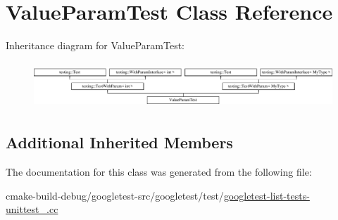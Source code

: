 \hypertarget{classValueParamTest}{}\section{Value\+Param\+Test Class Reference}
\label{classValueParamTest}
Inheritance diagram for Value\+Param\+Test\+:\begin{figure}[H]
\begin{center}
\leavevmode
\includegraphics[height=1.735537cm]{classValueParamTest}
\end{center}
\end{figure}
\subsection*{Additional Inherited Members}


The documentation for this class was generated from the following file\+:\begin{DoxyCompactItemize}
\item 
cmake-\/build-\/debug/googletest-\/src/googletest/test/\mbox{\hyperlink{googletest-list-tests-unittest___8cc}{googletest-\/list-\/tests-\/unittest\+\_\+.\+cc}}\end{DoxyCompactItemize}

